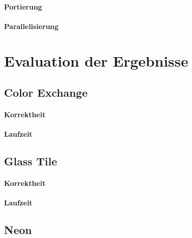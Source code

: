 \documentclass[10pt,a4paper,draft]{article}
\begin{document}
\paragraph{Portierung}
\paragraph{Parallelisierung}


\section{Evaluation der Ergebnisse}
\subsection{Color Exchange}
\paragraph{Korrektheit}
\paragraph{Laufzeit}
\subsection{Glass Tile}
\paragraph{Korrektheit}
\paragraph{Laufzeit}
\subsection{Neon}
\end{document}
